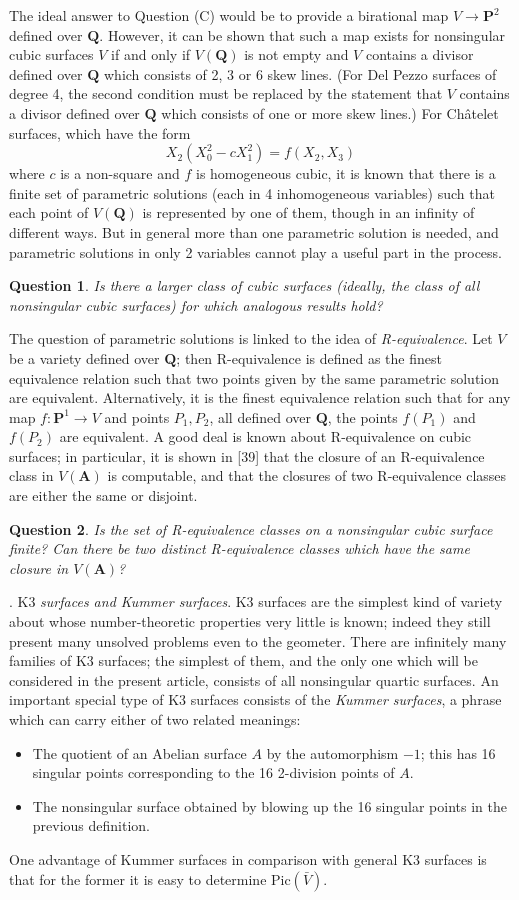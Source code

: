 \documentclass[12pt]{article}
\def\bA{{\mathbf A}}
\def\bP{{\mathbf P}}
\def\bQ{{\mathbf Q}}
\def\bpr{\begin{question} \label}
\def\epr{\end{question}}
\newtheorem{question}{Question}
\begin{document}
The ideal answer to Question (C) would be to provide a birational map
$V\rightarrow\bP^2$ defined over $\bQ$. However, it can be shown that such a
map exists for nonsingular cubic surfaces $V$ if and only if $V(\bQ)$ is not
empty and $V$ contains a divisor defined over $\bQ$ which consists of 2, 3
or 6 skew lines. (For Del Pezzo surfaces of degree 4, the second condition
must be replaced by the statement that $V$ contains a divisor defined over
$\bQ$ which consists of one or more skew lines.) For Ch\^{a}telet surfaces,
which have the form
\[ X_2(X_0^2-cX_1^2)=f(X_2,X_3) \]
where $c$ is a non-square and $f$ is homogeneous cubic, it is known that
there is a finite set of parametric solutions (each in 4 inhomogeneous
variables) such that each point of $V(\bQ)$ is represented by one of them,
though in an infinity of different ways.
But in general more than one parametric solution is needed, and parametric
solutions in only 2 variables cannot play a useful part in the process.
\bpr{Q21} Is there a larger class of cubic surfaces (ideally, the class of
all nonsingular cubic surfaces) for which analogous results hold?
\epr

The question of parametric solutions is linked to the idea of
\emph{R-equivalence}.
Let $V$ be a variety defined over $\bQ$; then R-equivalence is defined as the
finest equivalence relation such that two points given by the same parametric
solution are equivalent. Alternatively, it is the finest equivalence relation
such that for any map $f:\bP^1\rightarrow V$ and points $P_1,P_2$, all
defined over $\bQ$, the points $f(P_1)$ and $f(P_2)$ are equivalent. A good
deal is known about R-equivalence on cubic surfaces; in particular, it is
shown in [39] that the closure of an R-equivalence class in $V(\bA)$ is
computable, and that the closures of two R-equivalence classes are either
the same or disjoint.
\bpr{Q22} Is the set of R-equivalence classes on a nonsingular cubic surface
finite? Can there be two distinct R-equivalence classes which have the same
closure in $V(\bA)$?
\epr

\bigskip

. K3 \emph{surfaces and Kummer surfaces}. \newline
K3 surfaces are the simplest kind of variety about whose number-theoretic
properties very little is known; indeed they still present many unsolved
problems even
to the geometer. There are infinitely many families of K3 surfaces;
the simplest of them, and the only one which will be considered in the
present article, consists of all nonsingular quartic surfaces. An important
special type of K3 surfaces consists of the \emph{Kummer surfaces}, a phrase
which can carry either of two related meanings:
\begin{itemize}
\item The quotient of an Abelian surface $A$ by the automorphism $-1$; this
has 16 singular points corresponding to the 16 2-division points of $A$.
\item The nonsingular surface obtained by blowing up the 16 singular points
in the previous definition.
\end{itemize}
One advantage of Kummer surfaces in comparison
with general K3 surfaces is that for the
former it is easy to determine Pic$(\bar{V})$.
\end{document}
